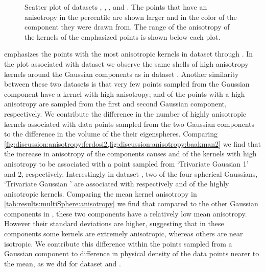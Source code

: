 \begin{figure}
\begin{subfigure}{0.23\textwidth}
				\caption{}
				\label{fig:discussion:anisotropy:baakman3}
			\end{subfigure}			
			\caption{Scatter plot of datasets
				 \ferdosiTwo, %
				 \baakmanTwo, %
				 \ferdosiThree, and %
				 \baakmanThree. %
				The points that have an anisotropy in the  percentile are shown larger and in the color of the component they were drawn from. The range of the anisotropy of the kernels of the emphasized points is shown below each plot.}
			\label{fig:discussion:anisotropy:multisphere}
		\end{figure}			
		 emphasizes the points with the most anisotropic kernels in dataset \ferdosiTwo through \baakmanThree. 
			In the plot associated with dataset \ferdosiTwo we observe the same shells of high anisotropy kernels around the Gaussian components as in dataset \ferdosiOne. Another similarity between these two datasets is that very few points sampled from the Gaussian component have a kernel with high anisotropy;  and  of the points with a high anisotropy are sampled from the first and second Gaussian component, respectively. 
			We contribute the difference in the number of highly anisotropic kernels associated with data points sampled from the two Gaussian components to the difference in the volume of the their eigenspheres.
			Comparing \cref{fig:discussion:anisotropy:ferdosi2,fig:discussion:anisotropy:baakman2} we find that the increase in anisotropy of the components causes  and  of the kernels with high anisotropy to be associated with a point sampled from `Trivariate Gaussian 1' and 2, respectively. 
			Interestingly in dataset \ferdosiThree, two of the four spherical Gaussians, \ie `Trivariate Gaussian ' are associated with respectively  and  of the highly anisotropic kernels.
			Comparing the mean kernel anisotropy in \cref{tab:results:multiSphere:anisotropy} we find that compared to the other Gaussian components in \ferdosiThree, these two components have a relatively low mean anisotropy. However their standard deviations are higher, suggesting that in these components some kernels are extremely anisotropic, whereas others are near isotropic. We contribute this difference within the points sampled from a Gaussian component to difference in physical density of the data points nearer to the mean, as we did for dataset \ferdosiOne and \baakmanOne.
